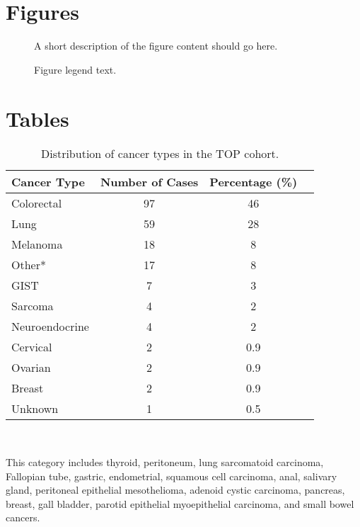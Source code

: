 \documentclass{bmcart}
\begin{document}
\begin{backmatter}

\section*{Figures}
  \begin{figure}[h!]
  \caption{
      A short description of the figure content
      should go here.}
      \end{figure}

\begin{figure}[h!]
  \caption{
      Figure legend text.}
      \end{figure}


\section*{Tables}

\begin{table}[!h]
\caption{Distribution of cancer types in the TOP cohort.}\label{cancertypes}
      \begin{tabular}{lccc}
        \hline
        Cancer Type & Number of Cases & Percentage (\%) \\ \hline
        Colorectal & 97 & 46 \\
        Lung & 59 & 28 \\
        Melanoma & 18 & 8 \\
				Other* & 17 & 8 \\
				GIST & 7 & 3 \\
				Sarcoma & 4 & 2 \\
				Neuroendocrine & 4 & 2 \\
				Cervical & 2 & 0.9 \\
				Ovarian & 2 & 0.9 \\
				Breast & 2 & 0.9 \\
				Unknown & 1 & 0.5 \\ \hline
      \end{tabular} \\
\raggedright
{\small *This category includes thyroid, peritoneum, lung sarcomatoid carcinoma, Fallopian tube, gastric, endometrial, squamous cell carcinoma, anal, salivary gland, peritoneal epithelial mesothelioma, adenoid cystic carcinoma, pancreas, breast, gall bladder, parotid epithelial myoepithelial carcinoma, and small bowel cancers.}
\end{table}


\end{backmatter}
\end{document}

